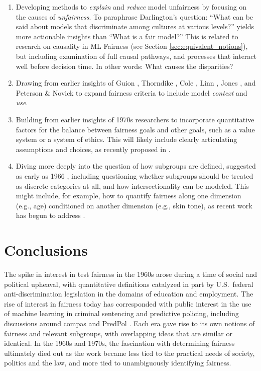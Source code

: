 \documentclass[sigconf,letterpaper,9pt]{acmart}
\begin{document}
\begin{enumerate}

    \item Developing methods to {\em explain} and {\em reduce}
    model unfairness 
    by focusing on the causes of {\em unfairness}.  To paraphrase Darlington's \cite{darlington1971another} question:
    ``What can be said about models that discriminate among
cultures at various levels?'' yields more actionable insights than ``What is a fair model?''
    This is related to research on causality in ML Fairness (see Section \ref{sec:equivalent_notions}),  but 
     including examination of full causal pathways, and processes that interact well before decision time. In other words: What causes the disparities?
    \item Drawing from earlier insights of Guion \cite{guion1966employment}, Thorndike \cite{thorndike1971concepts}, Cole \cite{cole1973bias}, Linn \cite{linn1973fair}, Jones \cite{jones1973moderated}, and Peterson \& Novick \cite{petersen1976evaluation} to expand fairness criteria to include model {\em context} and {\em use}.
    \item Building from earlier insights of 1970s researchers \cite{darlington1971another,hunter1976critical,linn1976insearch}
    to incorporate quantitative factors for the balance between fairness goals and other
    goals, such as a value system or a system of ethics.  This will likely include clearly articulating assumptions and choices, as recently proposed in \cite{MitchellEtAl2018}. 
    \item Diving more deeply into the question of how subgroups are defined, suggested as early as 1966 \cite{guion1966employment}, including questioning whether subgroups should be treated as discrete categories at all, and how intersectionality can be modeled.  This might include, for
example, how to quantify fairness along one dimension (e.g., age) conditioned on another
dimension (e.g., skin tone), as recent work has begun to address \cite{KearnsEtAl2018,FouldsPan2018}.
\end{enumerate}


\section{Conclusions}

The spike in interest in test fairness in the 1960s arose during a time of social and political upheaval, with quantitative definitions catalyzed in part by  U.S.\ federal anti-discrimination legislation in the 
domains of education and employment.  The rise of interest in fairness today has corresponded with public interest in the use of machine learning in criminal sentencing and predictive policing, including discussions around {\sc compas} \cite{larson2016analyzed, dieterich2016compas, corbettdavies2016computer} and 
{PredPol} \cite{oneill2016weapons,ensign2017runaway}.  Each era gave rise to its own notions of fairness and relevant subgroups, with overlapping ideas that are similar or identical.  In the 1960s and 1970s, the fascination with determining fairness ultimately died out as the work became less tied to the practical needs of society, politics and the law, and more tied to unambiguously identifying fairness. 
\end{document}
